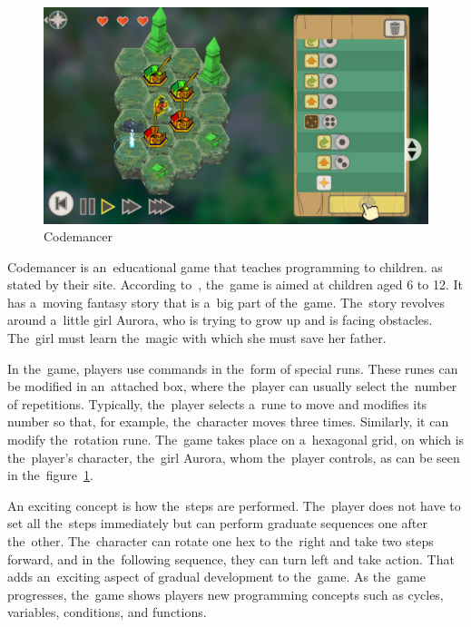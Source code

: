 \begin{figure}
    \centering
    \includegraphics[width=1\linewidth]{assets/similar-games/codemancer.jpg}
    \caption{Codemancer~\cite{a2021_codemancer}}
    \label{fig:codemancer}
\end{figure}

Codemancer is an~educational game that teaches programming to children.
 as stated by their site.
According to~\cite{a2021_codemancer}, the~game is aimed at children aged 6 to 12.
It has a~moving fantasy story that is a~big part of the~game.
The~story revolves around a~little girl Aurora, who is trying to grow up and is facing obstacles.
The~girl must learn the~magic with which she must save her father.

In the~game, players use commands in the~form of special runs.
These runes can be modified in an~attached box, where the~player can usually select the~number of repetitions.
Typically, the~player selects a~rune to move and modifies its number so that, for example, the~character moves three times.
Similarly, it can modify the~rotation rune.
The~game takes place on a~hexagonal grid, on which is the~player's character, the~girl Aurora, whom the~player controls, as can be seen in the~figure~\ref{fig:codemancer}.

An exciting concept is how the~steps are performed.
The~player does not have to set all the~steps immediately but can perform graduate sequences one after the~other.
The~character can rotate one hex to the~right and take two steps forward, and in the~following sequence, they can turn left and take action.
That adds an~exciting aspect of gradual development to the~game.
As the~game progresses, the~game shows players new programming concepts such as cycles, variables, conditions, and functions. 

